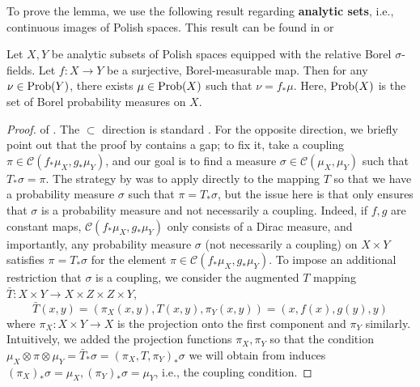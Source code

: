 \documentclass[twoside,11pt]{article}
\theoremstyle{definition}
\newcommand{\define}[1]{\textbf{#1}}
\begin{document}
To prove the lemma,  we use the following result regarding \define{analytic sets}, i.e., continuous images of Polish spaces. This result can be found in \citep[Lemma 2.2]{Varadarajan1963Groups} or \citep[Lemma 27]{chowdhury2019gromov}

\begin{lemma}
    \label{lem:varadarajan}
    Let $X, Y$ be analytic subsets of Polish spaces equipped with the relative Borel $\sigma$-fields. Let $f:X\to Y$ be a surjective, Borel-measurable map. Then for any $\nu\in \textnormal{Prob}(Y)$, there exists $\mu\in \textnormal{Prob}(X)$ such that $\nu=f_*\mu$. Here, $\textnormal{Prob}(X)$ is the set of Borel probability measures on $X$.
\end{lemma}

\begin{proof}of .
    The $\subset$ direction is standard \citep{chowdhury2019gromov}. For the opposite direction, we briefly point out that the proof by \citet{chowdhury2019gromov} contains a gap; to fix it, take a coupling $\pi \in \mathcal{C}(f_*\mu_X, g_*\mu_Y)$, and our goal is to find a measure $\sigma\in \mathcal{C}(\mu_X, \mu_Y)$ such that $T_* \sigma = \pi$. The strategy by \citet{chowdhury2019gromov} was to apply  directly to the mapping $T$ so that we have a probability measure $\sigma$ such that $\pi=T_*\sigma$, but the issue here is that  only ensures that $\sigma$ is a probability measure and not necessarily a coupling. Indeed, if $f,g$ are constant maps, $\mathcal{C}(f_*\mu_X, g_*\mu_Y)$ only consists of a Dirac measure, and importantly, any probability measure $\sigma$ (not necessarily a coupling) on $X\times Y$ satisfies $\pi=T_* \sigma$ for the element $\pi\in\mathcal{C}(f_*\mu_X, g_*\mu_Y)$. To impose an additional restriction that $\sigma$ is a coupling, we consider the augmented $T$ mapping $\bar{T}:X\times Y \to X\times Z\times Z\times Y$,
    \begin{equation}
    \bar{T}(x,y)=(\pi_{X}(x,y),T(x,y), \pi_{Y}(x,y)) = (x,f(x),g(y),y)
    \end{equation}
    where $\pi_{X}:X\times Y\to X$ is the projection onto the first component and $\pi_{Y}$ similarly. Intuitively, we added the projection functions $\pi_{X},\pi_{Y}$ so that the condition $\mu_{X}\otimes \pi\otimes \mu_{Y}=\bar{T}_{*}\sigma =(\pi_{X}, T, \pi_{Y})_* \sigma$ we will obtain from  induces $(\pi_{X})_* \sigma=\mu_X, (\pi_{Y})_* \sigma = \mu_Y$, i.e., the coupling condition.
    

\end{proof}
\end{document}
